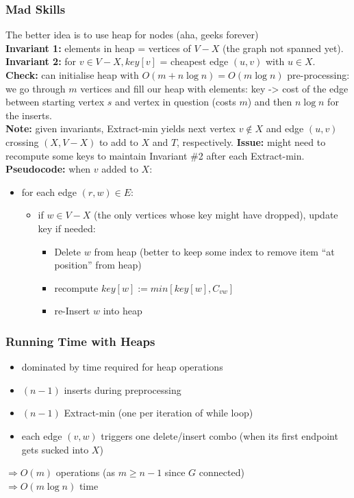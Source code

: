 \documentclass{scrartcl}
\begin{document}
\subsubsection{Mad Skills}
\label{sec:5-6-1}
The better idea is to use heap for nodes (aha, geeks forever)\\
{\bf Invariant 1: } elements in heap = vertices of $V - X$ (the graph not
spanned yet).\\
{\bf Invariant 2: } for $v \in V-X, key[v]$ = cheapest edge $(u, v)$ with $u
\in X$.\\
{\bf Check: } can initialise heap with $O(m + n \log n)= O(m \log n)$
pre-processing: we go through $m$ vertices and fill our heap with elements: key
-> cost of the edge between starting vertex $s$ and vertex in question
(costs $m$) and then $n \log n$ for the inserts.\\
{\bf Note: } given invariants, Extract-min yields next vertex $v \notin X$ and
edge $(u, v)$ crossing $(X, V-X)$ to add to $X$ and $T$, respectively.
{\bf Issue: } might need to recompute some keys to maintain Invariant \#2 after
each Extract-min.\\
{\bf Pseudocode: } when $v$ added to $X$:
\begin{itemize}
\item for each edge $(r, w) \in E$:
  \begin{itemize}
  \item if $w \in V-X$ (the only vertices whose key might have dropped), update
    key if needed:
    \begin{itemize}
    \item Delete $w$ from heap (better to keep some index to remove item ``at
      position'' from heap)
    \item recompute $key[w] := min[key[w], C_{vw}]$
    \item re-Insert $w$ into heap
    \end{itemize}
  \end{itemize}
\end{itemize}

\subsubsection{Running Time with Heaps}
\label{sec:5-7-1}
\begin{itemize}
\item dominated by time required for heap operations
\item $(n-1)$ inserts during preprocessing
\item $(n-1)$ Extract-min (one per iteration of while loop)
\item each edge $(v, w)$ triggers one delete/insert combo (when its first
  endpoint gets sucked into $X$)\\
\end{itemize}
$\Rightarrow O(m)$ operations (as $m \geq n -1$  since $G$ connected)\\
$\Rightarrow O(m \log n)$ time \\
\end{document}
